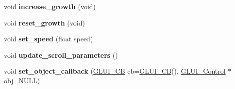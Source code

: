 \begin{DoxyCompactItemize}
\item 
\hypertarget{classGLUI__Scrollbar_a2bf1121968251b280e917d657fa0dc28}{void {\bfseries increase\-\_\-growth} (void)}\label{classGLUI__Scrollbar_a2bf1121968251b280e917d657fa0dc28}

\item 
\hypertarget{classGLUI__Scrollbar_a92d94cb2a3a19b5f8e8e5ab62b44cf89}{void {\bfseries reset\-\_\-growth} (void)}\label{classGLUI__Scrollbar_a92d94cb2a3a19b5f8e8e5ab62b44cf89}

\item 
\hypertarget{classGLUI__Scrollbar_aa94898fe6a3cd99b8c65c7b68ba079e0}{void {\bfseries set\-\_\-speed} (float speed)}\label{classGLUI__Scrollbar_aa94898fe6a3cd99b8c65c7b68ba079e0}

\item 
\hypertarget{classGLUI__Scrollbar_acb6c92188a213dd09441807bb3cf103c}{void {\bfseries update\-\_\-scroll\-\_\-parameters} ()}\label{classGLUI__Scrollbar_acb6c92188a213dd09441807bb3cf103c}

\item 
\hypertarget{classGLUI__Scrollbar_a7d26927f9679f449e6b5628a13851efc}{void {\bfseries set\-\_\-object\-\_\-callback} (\hyperlink{classGLUI__CB}{G\-L\-U\-I\-\_\-\-C\-B} cb=\hyperlink{classGLUI__CB}{G\-L\-U\-I\-\_\-\-C\-B}(), \hyperlink{classGLUI__Control}{G\-L\-U\-I\-\_\-\-Control} $\ast$obj=N\-U\-L\-L)}\label{classGLUI__Scrollbar_a7d26927f9679f449e6b5628a13851efc}

\end{DoxyCompactItemize}
